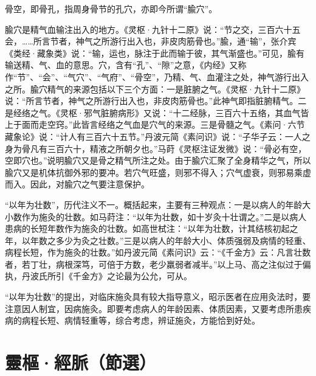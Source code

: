 \documentclass[12pt]{ctexbook}%
\begin{document}


骨空，即骨孔，指周身骨节的孔穴，亦即今所谓“腧穴”。

腧穴是精气血输注出入的地方。《灵枢·九针十二原》说：“节之交，三百六十五会，……所言节者，神气之所游行出入也，非皮肉筋骨也。”腧，通“输”，张介宾《类经·藏象类》说：“输，运也，脉注于此而输于彼，其气渐盛也。”可见，腧有输送精、气、血的意思。穴，含有“孔”、“隙”之意，《内经》又称作“节”、“会”、“气穴”、“气府”、“骨空”，乃精、气、血灌注之处，神气游行出入之所。腧穴精气的来源包括以下三个方面：一是脏腑之气。《灵枢·九针十二原》说：“所言节者，神气之所游行出入也，非皮肉筋骨也。”此神气即指脏腑精气。二是经络之气。《灵枢·邪气脏腑病形》又说：“十二经脉，三百六十五络，其血气皆上于面而走空窍。”此皆言经络之气血是穴气的来源。三是骨髓之气。《素问·六节藏象论》说：“计人有三百六十五节。”丹波元简《素问识》说：“子华子云：一人之身为骨凡有三百六十，精液之所朝夕也。”马莳《灵枢注证发微》说：“骨必有空，空即穴也。”说明腧穴又是骨之精气所注之处。由于腧穴汇聚了全身精华之气，所以腧穴又是机体抗御外邪的要冲。若穴气旺盛，则邪不得入；穴气虚衰，则邪易乘虚而入。因此，对腧穴之气要注意保护。



“以年为壮数”，历代注义不一。概括起来，主要有三种观点：一是以病人的年龄大小数作为施灸的壮数。如马莳注：“以年为壮数，如十岁灸十壮谓之。”二是以病人患病的长短年数作为施灸的壮数。如高世栻注：“以年为壮数，计其结核初起之年，以年数之多少为灸之壮数。”三是以病人的年龄大小、体质强弱及病情的轻重、病程长短，作为施灸的壮数。”如丹波元简《素问识》云：“《千金方》云：凡言壮数者，若丁壮，病根深笃，可倍于方数，老少羸弱者减半。”以上马、高之注似过于偏执，丹波氏所引《千金方》之论最为公允，可从。

“以年为壮数”的提出，对临床施灸具有较大指导意义，昭示医者在应用灸法时，要注意因人制宜，因病施灸。即要考虑病人的年龄因素、体质因素，又要考虑所患疾病的病程长短、病情轻重等，综合考虑，辨证施灸，方能恰到好处。

\section{靈樞·經脈（節選）}%

\end{document}
